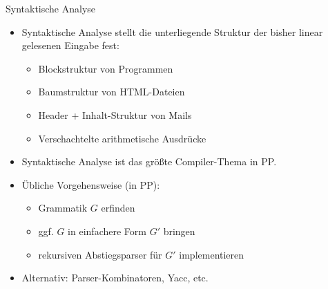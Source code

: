 \documentclass{beamer}
\begin{document}
\begin{frame}{Syntaktische Analyse}
	\begin{itemize}
		\item Syntaktische Analyse stellt die unterliegende Struktur der bisher linear gelesenen Eingabe fest:
		\begin{itemize}
			\item Blockstruktur von Programmen
			\item Baumstruktur von HTML-Dateien
			\item Header + Inhalt-Struktur von Mails
			\item Verschachtelte arithmetische Ausdrücke
		\end{itemize}
		\item Syntaktische Analyse ist das größte Compiler-Thema in PP.
		\pause
		\item Übliche Vorgehensweise (in PP):
		\begin{itemize}
			\item Grammatik $G$ erfinden
			\item ggf. $G$ in einfachere Form $G'$ bringen
			\item rekursiven Abstiegsparser für $G'$ implementieren
		\end{itemize}
		\item Alternativ: Parser-Kombinatoren, Yacc, etc.
	\end{itemize}
\end{frame}
\end{document}
